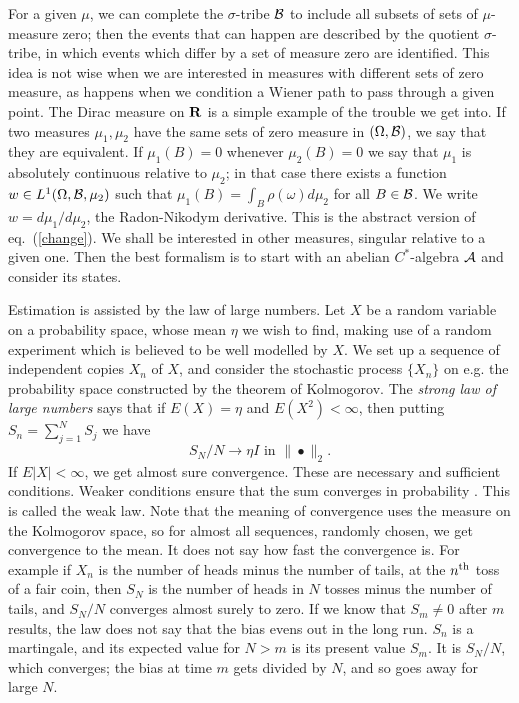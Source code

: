 For a given $\mu$, we can complete the $\sigma$-tribe ${\cal B}$ to include
all subsets of sets of $\mu$-measure zero; then the events that can happen
are described by the quotient $\sigma$-tribe, in which events which differ
by a set of measure zero are identified. This idea is not wise when we are
interested in measures with different sets of zero measure, as happens when
we condition a Wiener path to pass through a given point. The Dirac measure
on ${\bf R}$ is a simple example of the trouble we get into. If two
measures $\mu_1,\mu_2$ have the same sets of zero measure in $(\Omega,{\cal
B})$, we say that they are equivalent. If $\mu_1(B)=0$ whenever $\mu_2(B)=0$
we say that $\mu_1$ is absolutely continuous relative to $\mu_2$; in that
case there exists a function $w\in L^1(\Omega,{\cal B},\mu_2)$ such that
$\mu_1(B)=\int_B\rho(\omega)d\mu_2$ for all $B\in{\cal B}$. We write
$w=d\mu_1/d\mu_2$, the Radon-Nikodym derivative. This is the abstract
version of eq.~(\ref{change}). We shall be interested in other measures,
singular relative to a given one. Then the best formalism is to start with
an abelian $C^*$-algebra ${\cal A}$ and consider its states.

Estimation is assisted by the law of large numbers.
Let $X$ be a random variable on a probability space, whose mean $\eta$ we
wish to find, making use of a random experiment which is believed to be
well modelled by $X$. We set up a sequence of independent copies $X_n$
of $X$, and
consider the stochastic process $\{X_n\}$ on e.g. the probability space
constructed by the theorem of Kolmogorov. The {\em strong law of
large numbers} says that if $E(X)=\eta$ and $E(X^2)<\infty$, then putting
$S_n=\sum_{j=1}^N S_j$ we have
\[S_N/N\rightarrow \eta I \mbox{ in }\|\bullet
\|_2.\]
If $E|X|<\infty$, we get almost sure convergence. These are necessary and
sufficient conditions.
Weaker conditions ensure that the sum converges in probability
\cite{Grimmett}. This is called the weak law.
Note that the meaning of convergence uses the measure on the Kolmogorov space,
so for almost all sequences, randomly chosen, we get convergence to the mean.
It does not say how fast the convergence is.
For example if $X_n$ is the number of heads minus the number of tails,
at the $n^{\rm th}$ toss of a fair coin, then $S_N$ is the number of heads in $N$
tosses minus the number of tails, and $S_N/N$ converges almost surely to
zero. If we know that $S_m\neq 0$ after $m$ results, the law does not say
that the bias evens out in the long run.
$S_n$ is a martingale, and its expected value for $N>m$ is its present
value $S_m$. It is $S_N/N$, which converges; the bias at time
$m$ gets divided by $N$, and so goes away for large $N$.


